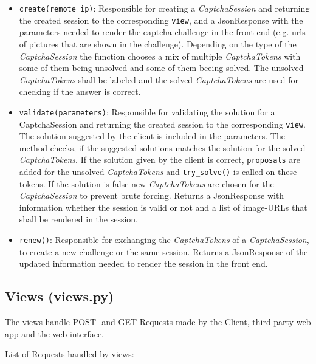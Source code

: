 \begin{itemize}
\item \verb|create(remote_ip)|: Responsible for creating a \emph{CaptchaSession} and returning the created session to the corresponding \verb|view|, and a JsonResponse with the parameters needed to render the captcha challenge in the front end (e.g. urls of pictures that are shown in the challenge). Depending on the type of the \emph{CaptchaSession} the function chooses a mix of multiple \emph{CaptchaTokens} with some of them being unsolved and some of them beeing solved. The unsolved \emph{CaptchaTokens} shall be labeled and the solved \emph{CaptchaTokens} are used for checking if the answer is correct. 
\item \verb|validate(parameters)|: Responsible for validating the solution for a CaptchaSession and returning the created session to the corresponding \verb|view|. The solution suggested by the client is included in the parameters. The method checks, if the suggested solutions matches the solution for the solved \emph{CaptchaTokens}. If the solution given by the client is correct, \verb|proposals| are added for the unsolved \emph{CaptchaTokens} and \verb|try_solve()| is called on these tokens. If the solution is false new \emph{CaptchaTokens} are chosen for the \emph{CaptchaSession} to prevent brute forcing. Returns a JsonResponse with information whether the session is valid or not and a list of image-URLs that shall be rendered in the session.
\item \verb|renew()|: Responsible for exchanging the \emph{CaptchaTokens} of a \emph{CaptchaSession}, to create a new challenge or the same session. Returns a JsonResponse of the updated information needed to render the session in the front end.
\end{itemize}


\subsection{Views (views.py)}

The views handle POST- and GET-Requests made by the Client, third party web app and the web interface. 

List of Requests handled by views:

